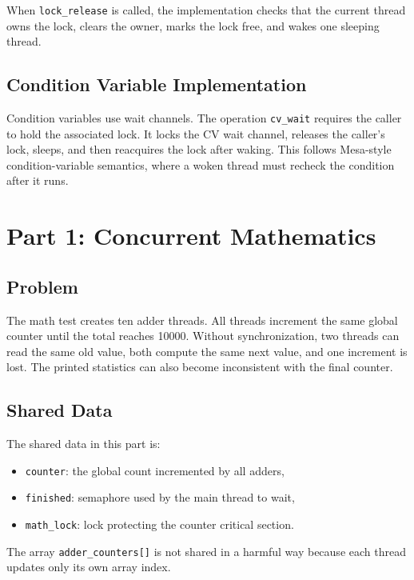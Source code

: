 \documentclass[12pt,a4paper]{article}
\begin{document}
When \texttt{lock\_release} is called, the implementation checks that the
current thread owns the lock, clears the owner, marks the lock free, and wakes
one sleeping thread.

\subsection{Condition Variable Implementation}

Condition variables use wait channels. The operation \texttt{cv\_wait}
requires the caller to hold the associated lock. It locks the CV wait channel,
releases the caller's lock, sleeps, and then reacquires the lock after waking.
This follows Mesa-style condition-variable semantics, where a woken thread must
recheck the condition after it runs.

\section{Part 1: Concurrent Mathematics}

\subsection{Problem}

The math test creates ten adder threads. All threads increment the same global
counter until the total reaches 10000. Without synchronization, two threads can
read the same old value, both compute the same next value, and one increment is
lost. The printed statistics can also become inconsistent with the final
counter.

\subsection{Shared Data}

The shared data in this part is:

\begin{itemize}
    \item \texttt{counter}: the global count incremented by all adders,
    \item \texttt{finished}: semaphore used by the main thread to wait,
    \item \texttt{math\_lock}: lock protecting the counter critical section.
\end{itemize}

The array \texttt{adder\_counters[]} is not shared in a harmful way because
each thread updates only its own array index.
\end{document}
